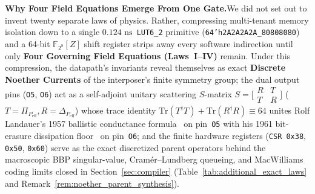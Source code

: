 \documentclass[11pt,letterpaper]{article}
\providecommand{\StageOneNs}{\ensuremath{0.124\text{~ns}}}
\providecommand{\StageOneSieveDelayNs}{\StageOneNs}
\theoremstyle{spectralthm}
\begin{document}
\noindent\textbf{Why Four Field Equations Emerge From One Gate.}\;We did not set out to invent twenty separate laws of physics. Rather, compressing multi-tenant memory isolation down to a single \StageOneSieveDelayNs\ \mbox{\texttt{LUT6\_2}} primitive (\texttt{64'h2A2A2A2A\_80808080}) and a 64-bit $\mathbb{F}_{2^8}[Z]$ shift register strips away every software indirection until only \textbf{Four Governing Field Equations (Laws~I--IV)} remain. Under this compression, the datapath's invariants reveal themselves as exact \textbf{Discrete Noether Currents} of the interposer's finite symmetry group; the dual output pins (\texttt{O5}, \texttt{O6}) act as a self-adjoint unitary scattering $S$-matrix $S = \bigl[\begin{smallmatrix}R & T\\ T & R\end{smallmatrix}\bigr]$ ($T = \Pi_{P_{\mathrm{eff}}}, R = \Delta_{P_{\mathrm{eff}}}$) whose trace identity $\mathrm{Tr}(T^\dagger T) + \mathrm{Tr}(R^\dagger R) \equiv 64$ unites Rolf Landauer's 1957 ballistic conductance formula~\cite{landauer1957spatial} on pin~\texttt{O5} with his 1961 bit-erasure dissipation floor~\cite{1} on pin~\texttt{O6}; and the finite hardware registers (\texttt{CSR 0x38}, \texttt{0x50}, \texttt{0x60}) serve as the exact discretized parent operators behind the macroscopic BBP singular-value, Cram\'{e}r--Lundberg queueing, and MacWilliams coding limits closed in Section~\ref{sec:compiler} (Table~\ref{tab:additional_exact_laws} and Remark~\ref{rem:noether_parent_synthesis}).
\end{document}
